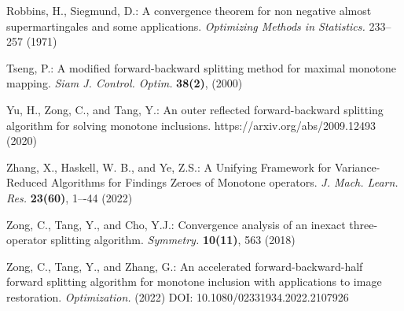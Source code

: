 \documentclass[a4paper,12pt]{article}
\theoremstyle{definition}
\begin{document}
\begin{thebibliography}{99}
%
Robbins, H., Siegmund, D.: A convergence theorem for non negative almost supermartingales and some applications. \textit{Optimizing Methods in Statistics.} 233--257 (1971)

Tseng, P.: A modified forward-backward splitting method for maximal monotone mapping.
\textit{Siam J. Control. Optim.} \textbf{38(2)}, (2000)

Yu, H., Zong, C., and Tang, Y.: An outer reflected forward-backward splitting algorithm for solving monotone inclusions. https://arxiv.org/abs/2009.12493 (2020)

Zhang, X., Haskell, W. B., and Ye, Z.S.: A Unifying Framework for Variance-Reduced Algorithms
for Findings Zeroes of Monotone operators. \textit{J. Mach. Learn. Res.}
\textbf{23(60)}, 1–-44 (2022)

Zong, C., Tang, Y., and Cho, Y.J.: Convergence analysis of an inexact three-operator splitting algorithm. \textit{Symmetry.} \textbf{10(11)}, 563 (2018)

Zong, C., Tang, Y., and Zhang, G.: An accelerated forward-backward-half forward splitting algorithm for monotone inclusion with applications to image restoration.  \textit{Optimization.} (2022) DOI: 10.1080/02331934.2022.2107926
\end{thebibliography}


	
\end{document}
